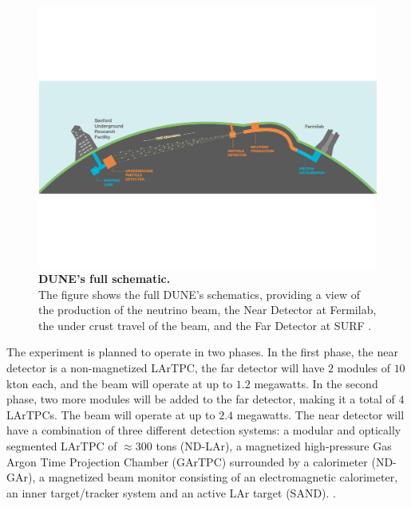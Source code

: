 \begin{figure}[h!]
	\begin{center}
		\includegraphics[scale=0.6]{Figures/DUNE_full_schematic.pdf}
		\caption[DUNE's full schematic]{ {\textbf{DUNE's full schematic.}} \\The figure shows the full DUNE's schematics, providing a view of the production of the neutrino beam, the Near Detector at Fermilab, the under crust travel of the beam, and the Far Detector at SURF \cite{dune_snowmass_22}.}
		\label{DUNE_full_schematic}	
	\end{center}
\end{figure}

The experiment is planned to operate in two phases. In the first phase, the near detector is a non-magnetized LArTPC, the far detector will have $2$ modules of $10$ kton each, and the beam will operate at up to $1.2$ megawatts. In the second phase, two more modules will be added to the far detector, making it a total of $4$ LArTPCs. The beam will operate at up to $2.4$ megawatts. The near detector will have a combination of three different detection systems: a modular and optically segmented LArTPC of $\approx300$ tons (ND-LAr), a magnetized high-pressure Gas Argon Time Projection Chamber (GArTPC) surrounded by a calorimeter (ND-GAr), a magnetized beam monitor consisting of an electromagnetic calorimeter, an inner target/tracker system and an active LAr target (SAND). \cite{dune_snowmass_22, dune_SAND}.
